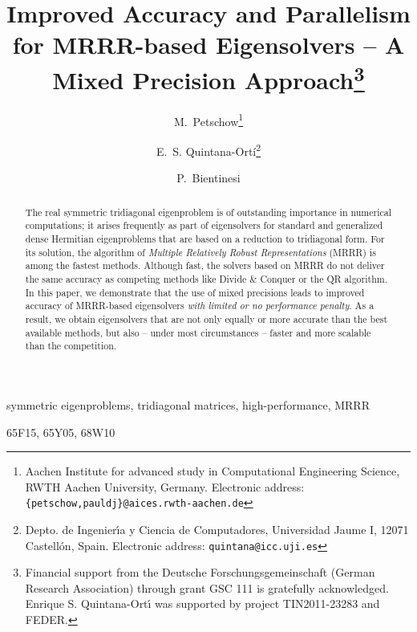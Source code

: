 \documentclass[final]{siamltex}
\begin{document}
\title{Improved Accuracy and Parallelism for MRRR-based Eigensolvers -- A Mixed Precision Approach\thanks{Financial support  
from the Deutsche Forschungsgemeinschaft (German Research Association)
through grant GSC 111 is gratefully acknowledged. Enrique S. Quintana-Ort\'{\i} was supported by project TIN2011-23283 and FEDER.}} 

\author{
  M.~Petschow\thanks{Aachen Institute for advanced study in Computational 
Engineering Science, RWTH Aachen University, Germany. Electronic address:
{\tt \{petschow,pauldj\}@aices.rwth-aachen.de}}
  \and E.~S. Quintana-Ort\'{i}\thanks{Depto. de Ingenier\'{\i}a y Ciencia de
    Computadores, Universidad Jaume I, 12071 Castell\'on, Spain. Electronic
    address: {\tt quintana@icc.uji.es}}
  \and P.~Bientinesi\footnotemark[2]
}





\aicescoverpage

\maketitle

\begin{abstract}
The real symmetric tridiagonal eigenproblem is of outstanding 
importance in numerical computations; it arises frequently as 
part of eigensolvers for standard and generalized 
dense Hermitian eigenproblems that are based on a
reduction to tridiagonal form.
For its solution, the algorithm of {\it Multiple Relatively
  Robust Representations} (MRRR) is among the fastest methods. 
Although fast, the solvers based on MRRR do not
deliver the same accuracy as competing methods like Divide \& Conquer or the
QR algorithm.   
In this paper, we demonstrate that the use of mixed precisions leads to
improved accuracy of MRRR-based eigensolvers {\it with limited or no
  performance penalty}. As a result, we obtain eigensolvers that are not
only equally or more accurate than the best available methods, but also --
under most circumstances -- faster and more scalable than the competition.
\end{abstract}

\begin{keywords} 
  symmetric eigenproblems, tridiagonal matrices, high-performance, MRRR
\end{keywords}

\begin{AMS}
65F15, 65Y05, 68W10
\end{AMS}
\end{document}

